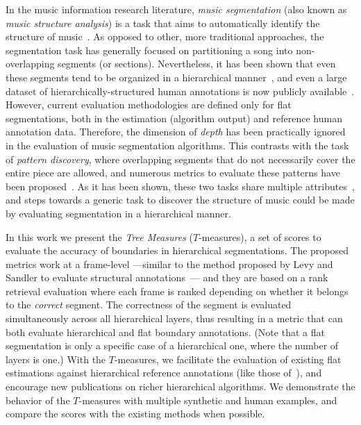 \documentclass{article}
\begin{document}
In the music information research literature, \emph{music segmentation} (also known as \emph{music structure analysis}) is a task that aims to automatically identify the structure of music~\cite{Paulus2010}.
As opposed to other, more traditional approaches, the segmentation task has generally focused on partitioning a song into non-overlapping segments (or sections).
Nevertheless, it has been shown that even these segments tend to be organized in a hierarchical manner~\cite{Peeters2009}, and even a large dataset of hierarchically-structured human annotations is now publicly available~\cite{Smith2011}.
However, current evaluation methodologies are defined only for flat segmentations, both in the estimation (algorithm output) and reference human annotation data.
Therefore, the dimension of \emph{depth} has been practically ignored in the evaluation of music segmentation algorithms.
This contrasts with the task of \emph{pattern discovery}, where overlapping segments that do not necessarily cover the entire piece are allowed, and numerous metrics to evaluate these patterns have been proposed~\cite{Collins2013}.
As it has been shown, these two tasks share multiple attributes~\cite{Nieto2014_Motives}, and steps towards a generic task to discover the structure of music could be made by evaluating segmentation in a hierarchical manner.


In this work we present the \emph{Tree Measures} ($T$-measures), a set of scores to evaluate the accuracy of boundaries in hierarchical segmentations.
The proposed metrics work at a frame-level ---similar to the method proposed by Levy and Sandler to evaluate structural annotations~\cite{Levy2008}--- and they are based on a rank retrieval evaluation where each frame is ranked depending on whether it belongs to the \emph{correct} segment.
The correctness of the segment is evaluated simultaneously across all hierarchical layers, thus resulting in a metric that can both evaluate hierarchical and flat boundary annotations. 
(Note that a flat segmentation is only a specific case of a hierarchical one, where the number of layers is one.)
With the $T$-measures, we facilitate the evaluation of existing flat estimations against hierarchical reference annotations (like those of~\cite{Smith2011}), and encourage new publications on richer hierarchical algorithms.
We demonstrate the behavior of the $T$-measures with multiple synthetic and human examples, and compare the scores with the existing methods when possible.
\end{document}
